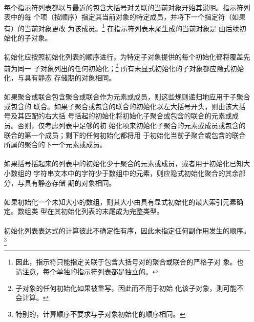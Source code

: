 {\paragraph{}
每个指示符列表都以与最近的包含大括号对关联的当前对象开始其说明。指示符列表中的每
个项（按顺序）指定其当前对象的特定成员，并将下一个指定符（如果有）的当前对象更改
为该成员。\footnote{因此，指示符只能指定关联于包含大括号对的聚合或联合的严格子对
象。也请注意，每个单独的指示符列表都是独立的。} 在指示符列表末尾生成的当前对象是
由后续初始化的子对象。

\paragraph{}
初始化应按照初始化列表的顺序进行，为特定子对象提供的每个初始化都将覆盖先前为同一
子对象列出的任何初始化；\footnote{子对象的任何初始化如果被重写，因此而不用于初始
化该子对象，则可能不会计算。} 所有未显式初始化的子对象都应隐式初始化，与具有静态
存储期的对象相同。

\paragraph{}
如果聚合或联合包含聚合或联合作为元素或成员，则这些规则递归地应用于子聚合或包含的
联合。如果子聚合或包含的联合的初始化以左大括号开头，则由该大括号及其匹配的右大括
号括起的初始化将初始化子聚合或包含的联合的元素或成员。否则，仅考虑列表中足够的初
始化项来初始化子聚合的元素或成员或包含的联合的第一个成员；剩下的任何初始化都将用
于初始化当前子聚合或包含的联合所属的聚合的下一个元素或成员。

\paragraph{}
如果括号括起来的列表中的初始化少于聚合的元素或成员，或者用于初始化已知大小数组的
字符串文本中的字符少于数组中的元素，则应隐式初始化聚合的其余部分，与具有静态存储
期的对象相同。

\paragraph{}
如果初始化一个未知大小的数组，则其大小由具有显式初始化的最大索引元素确定。数组类
型在其初始化列表的末尾成为完整类型。

\paragraph{}
初始化列表表达式的计算彼此不确定性有序，因此未指定任何副作用发生的顺序。
\footnote{特别的，计算顺序不要求与子对象初始化的顺序相同。}

}
